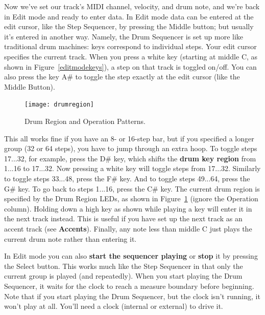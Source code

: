 \documentclass{article}
\begin{document}
Now we've set our track's MIDI channel, velocity, and drum note, and we're back in Edit mode and ready to enter data.  In Edit mode data can be entered at the edit cursor, like the Step Sequencer, by pressing the Middle button; but usually it's entered in another way.  Namely, the Drum Sequencer is set up more like traditional drum machines: keys correspond to individual steps.  Your edit cursor specifies the current track.  When you press a white key (starting at middle C, as shown in Figure~\ref{editmodekeys}), a step on that track is toggled on/off.  You can also press the key A\# to toggle the step exactly at the edit cursor (like the Middle Button).  

\begin{figure}
\hspace{\fill}\texttt{[image: drumregion]}\hspace{\fill}%
\vspace{-1em}
\caption{\small Drum Region and Operation Patterns.}
\label{drumregionpatterns}
\vspace{-1em}
\end{figure}


This all works fine if you have an 8- or 16-step bar, but if you specified a longer group (32 or 64 steps), you have to jump through an extra hoop.  To toggle steps 17...32, for example, press the D\# key, which shifts the {\bf drum key region} from 1...16 to 17...32.  Now pressing a white key will toggle steps from 17...32.  Similarly to toggle steps 33...48, press the F\# key.  And to toggle steps 49...64, press the G\# key.  To go back to steps 1...16, press the C\# key.  The current drum region is specified by the Drum Region LEDs, as shown in Figure~\ref{drumregionpatterns} (ignore the Operation column).  Holding down a high key as shown while playing a key will enter it in the next track instead.  This is useful if you have set up the next track as an accent track (see {\bf Accents}).  Finally, any note less than middle C just plays the current drum note rather than entering it.

In Edit mode you can also {\bf start the sequencer playing} or {\bf stop} it by pressing the Select button.  This works much like the Step Sequencer in that only the current group is played (and repeatedly).  When you start playing the Drum Sequencer, it waits for the clock to reach a measure boundary before beginning.  Note that if you start playing the Drum Sequencer, but the clock isn't running, it won't play at all.  You'll need a clock (internal or external) to drive it.
\end{document}
